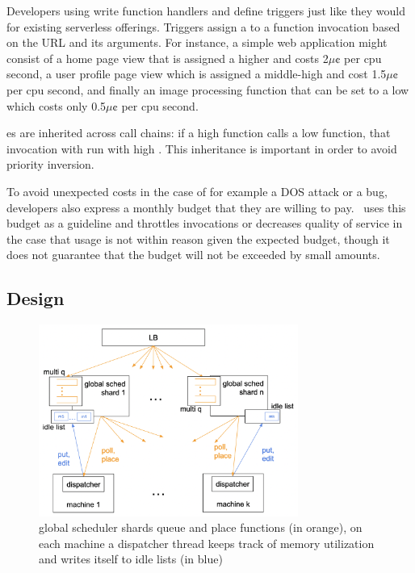 Developers using \sys{} write function handlers and define triggers
just like they would for existing serverless offerings.  Triggers
assign a \priceclass{} to a function invocation based on the URL
and its arguments. For instance, a simple web application might
consist of a home page view that is assigned a higher \priceclass{}
and costs 2$\mu\cent$ per cpu second, a user profile page view which
is assigned a middle-high \class{} and cost 1.5$\mu\cent$ per cpu
second, and finally an image processing function that can be set to a
low \class{} which costs only 0.5$\mu\cent$ per cpu second.

\Class{}es are inherited across call chains: if a high \class{} function calls a
low \class{} function, that invocation with run with high \class{}. This
inheritance is important in order to avoid priority inversion.

To avoid unexpected costs in the case of for example a DOS attack or a bug,
developers also express a monthly budget that they are willing to pay.~\Sys{}
uses this budget as a guideline and throttles invocations or decreases quality
of service in the case that usage is not within reason given the expected
budget, though it does not guarantee that the budget will not be exceeded by
small amounts.

\subsection{\Sys{} Design}

\begin{figure}[t]
    \centering
      \includegraphics[width=8.5cm]{img/overview.png}
      \caption{ global scheduler shards queue and place functions (in orange),
      on each machine a dispatcher thread keeps track of memory utilization and
      writes itself to idle lists (in blue) }
    \label{fig:overview}
\end{figure}



